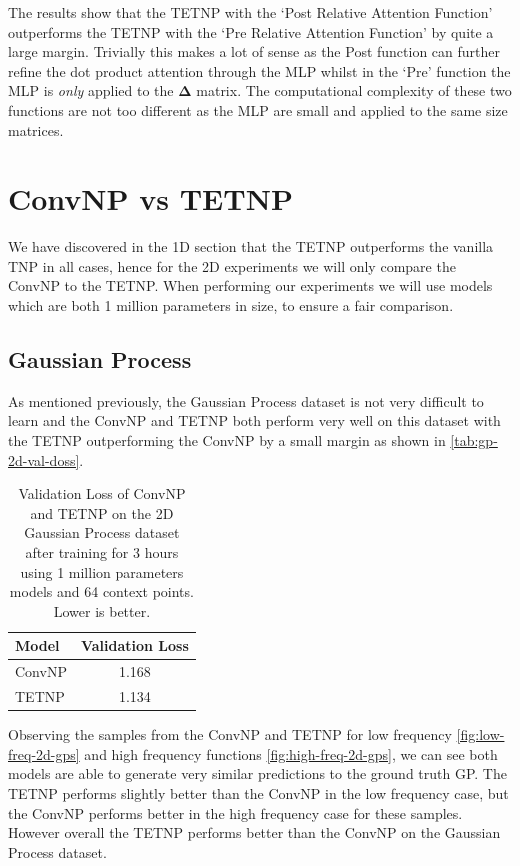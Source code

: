 \documentclass[../../main.tex]{subfiles}
\begin{document}
The results show that the TETNP with the `Post Relative Attention Function' outperforms the TETNP with the `Pre Relative Attention Function' by quite a large margin. Trivially this makes a lot of sense as the Post function can further refine the dot product attention through the MLP whilst in the `Pre' function the MLP is \emph{only} applied to the $\bm{\Delta}$ matrix. The computational complexity of these two functions are not too different as the MLP are small and applied to the same size matrices. 


\section{ConvNP vs TETNP}

We have discovered in the 1D section that the TETNP outperforms the vanilla TNP in all cases, hence for the 2D experiments we will only compare the ConvNP to the TETNP. When performing our experiments we will use models which are both 1 million parameters in size, to ensure a fair comparison.

\subsection{Gaussian Process}

As mentioned previously, the Gaussian Process dataset is not very difficult to learn and the ConvNP and TETNP both perform very well on this dataset with the TETNP outperforming the ConvNP by a small margin as shown in \autoref{tab:gp-2d-val-doss}.

\begin{table}[ht]
    \centering
    \begin{tabular}{lc}
        \toprule
        Model  & Validation Loss \\
        \midrule
        ConvNP & 1.168           \\
        TETNP  & 1.134           \\
        \bottomrule
    \end{tabular}
    \caption{Validation Loss of ConvNP and TETNP on the 2D Gaussian Process dataset after training for 3 hours using 1 million parameters models and 64 context points. Lower is better.}
    \label{tab:gp-2d-val-doss}
\end{table}

Observing the samples from the ConvNP and TETNP for low frequency \autoref{fig:low-freq-2d-gps} and high frequency functions \autoref{fig:high-freq-2d-gps}, we can see both models are able to generate very similar predictions to the ground truth GP. The TETNP performs slightly better than the ConvNP in the low frequency case, but the ConvNP performs better in the high frequency case for these samples. However overall the TETNP performs better than the ConvNP on the Gaussian Process dataset.
\end{document}
